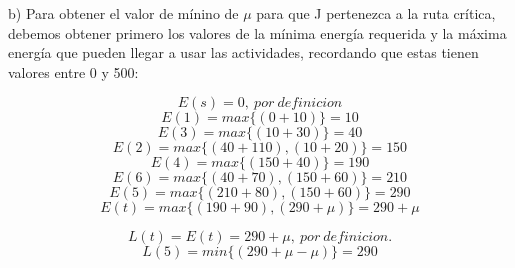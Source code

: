 \documentclass[letterpaper,10pt]{article}
\begin{document}
\begin{enumerate}
\begin{minipage}[b]{0.9\textwidth}
\begin{tikzpicture}[auto, node distance=2.9 cm,thick]
        
        \end{tikzpicture}
        \label{oliwis2}
        \end{minipage}
        \newline
        b) Para obtener el valor de mínino de $\mu$ para que J pertenezca a la ruta crítica, debemos obtener primero los valores de la mínima energía requerida y la máxima energía que pueden llegar a usar las actividades, recordando que estas tienen valores entre 0 y 500:
        \newline
        \begin{minipage}[t]{0.43\textwidth}
            \begin{equation*}
                E(s) = 0, \ por \ definicion
            \end{equation*}
            \begin{equation*}
                E(1) = max\{(0+10)\} = 10
            \end{equation*}
            \begin{equation*}
                E(3) = max\{(10+30)\} = 40
            \end{equation*}
            \begin{equation*}
                E(2) = max\{(40+110),(10+20)\} = 150
            \end{equation*}
            \begin{equation*}
                E(4) = max\{(150+40)\} = 190
            \end{equation*}
            \begin{equation*}
                E(6) = max\{(40+70),(150+60)\} = 210
            \end{equation*}
            \begin{equation*}
                E(5) = max\{(210+80),(150+60)\} = 290
            \end{equation*}
            \begin{equation*}
                E(t) = max\{(190+90),(290+\mu)\} = 290 + \mu
            \end{equation*}
        \end{minipage}
        \begin{minipage}[t]{0.498\textwidth}
            \begin{equation*}
                L(t) = E(t) = 290 + \mu, \ por \ definicion.
            \end{equation*}
            \begin{equation*}
                L(5) = min\{(290+\mu - \mu)\} = 290

\end{equation*}
\end{minipage}
\end{enumerate}
\end{document}
